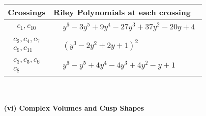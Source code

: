 \documentclass[1p]{elsarticle_modified}
\theoremstyle{definition}
\begin{document}
\begin{tabular}{m{50pt}|m{274pt}}
Crossings & \hspace{64pt}Riley Polynomials at each crossing \\
\hline $$\begin{aligned}c_{1},c_{10}\end{aligned}$$&$\begin{aligned}
&y^6-3 y^5+9 y^4-27 y^3+37 y^2-20 y+4
\end{aligned}$\\
\hline $$\begin{aligned}c_{2},c_{4},c_{7}\\c_{9},c_{11}\end{aligned}$$&$\begin{aligned}
&(y^3-2 y^2+2 y+1)^2
\end{aligned}$\\
\hline $$\begin{aligned}c_{3},c_{5},c_{6}\\c_{8}\end{aligned}$$&$\begin{aligned}
&y^6- y^5+4 y^4-4 y^3+4 y^2- y+1
\end{aligned}$\\
\hline
\end{tabular}\\~\\
\newpage\flushleft \textbf{(vi) Complex Volumes and Cusp Shapes}
\end{document}
